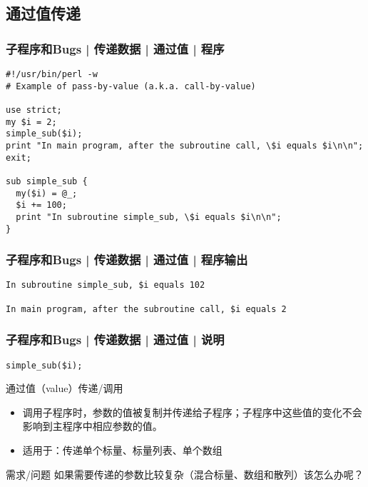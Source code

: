 \subsection{通过值传递}
\begin{frame}[fragile]
  \frametitle{子程序和Bugs | 传递数据 | 通过值 | 程序}
\begin{lstlisting}[basicstyle=\small\tt]
#!/usr/bin/perl -w
# Example of pass-by-value (a.k.a. call-by-value)

use strict;
my $i = 2;
simple_sub($i);
print "In main program, after the subroutine call, \$i equals $i\n\n";
exit;

sub simple_sub {
  my($i) = @_;
  $i += 100;
  print "In subroutine simple_sub, \$i equals $i\n\n";
}
\end{lstlisting}
\end{frame}

\begin{frame}[fragile]
  \frametitle{子程序和Bugs | 传递数据 | 通过值 | 程序输出}
\begin{lstlisting}
In subroutine simple_sub, $i equals 102

In main program, after the subroutine call, $i equals 2
\end{lstlisting}
\end{frame}

\begin{frame}[fragile]
  \frametitle{子程序和Bugs | 传递数据 | 通过值 | \alert{说明}}
\begin{lstlisting}
simple_sub($i);
\end{lstlisting}
\begin{block}{通过值（value）传递/调用}
  \begin{itemize}
    \item 调用子程序时，参数的值被复制并传递给子程序；子程序中这些值的变化不会影响到主程序中相应参数的值。
    \item 适用于：传递单个标量、标量列表、单个数组
  \end{itemize}
\end{block}
\pause
\begin{block}{需求/问题}
  如果需要传递的参数比较复杂（混合标量、数组和散列）该怎么办呢？
\end{block}
\end{frame}

